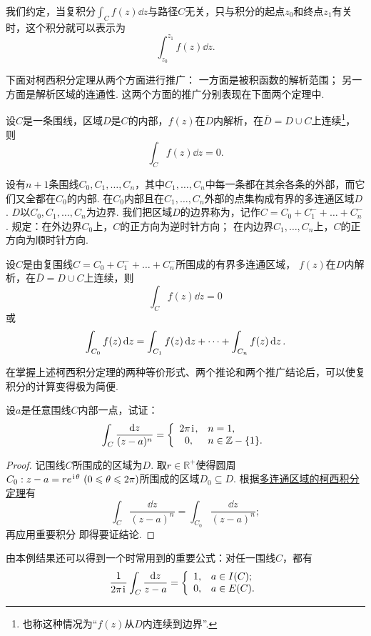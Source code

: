 我们约定，当复积分\(\int_C f(z) \dd{z}\)与路径\(C\)无关，只与积分的起点\(z_0\)和终点\(z_1\)有关时，这个积分就可以表示为\[
\int_{z_0}^{z_1} f(z) \dd{z}.
\]

下面对柯西积分定理从两个方面进行推广：
一方面是被积函数的解析范围；
另一方面是解析区域的连通性.
这两个方面的推广分别表现在下面两个定理中.
\begin{theorem}
设\(C\)是一条围线，区域\(D\)是\(C\)的内部，\(f(z)\)在\(D\)内解析，在\(\overline{D}=D \cup C\)上连续\footnote{%
也称这种情况为“\(f(z)\)从\(D\)内连续到边界”.%
}，则\[
\int_C f(z) \dd{z} = 0.
\]
\end{theorem}

\begin{definition}
设有\(n+1\)条围线\(C_0,C_1,\dots,C_n\)，其中\(C_1,\dots,C_n\)中每一条都在其余各条的外部，而它们又全都在\(C_0\)的内部.
在\(C_0\)内部且在\(C_1,\dots,C_n\)外部的点集构成有界的多连通区域\(D\).
\(D\)以\(C_0,C_1,\dots,C_n\)为边界.
我们把区域\(D\)的边界称为，记作\(C=C_0+C_1^-+\dots+C_n^-\).
规定：在外边界\(C_0\)上，\(C\)的正方向为逆时针方向；
在内边界\(C_1,\dots,C_n\)上，\(C\)的正方向为顺时针方向.
\end{definition}

\begin{theorem}[多连通区域的柯西积分定理]\label{theorem:解析函数的积分表示.多连通区域的柯西积分定理}
设\(C\)是由复围线\(C=C_0+C_1^-+\dots+C_n^-\)所围成的有界多连通区域，%
\(f(z)\)在\(D\)内解析，在\(\overline{D}=D \cup C\)上连续，则\[
\int_C f(z) \dd{z} = 0
\]或\begin{equation}
\def\Ic#1{\int_{C_{#1}} f(z) \dd{z}}
\Ic{0} = \Ic{1} + \dots + \Ic{n}.
\end{equation}
\end{theorem}

在掌握上述柯西积分定理的两种等价形式、两个推论和两个推广结论后，可以使复积分的计算变得极为简便.

\begin{example}
设\(a\)是任意围线\(C\)内部一点，试证：\[
\int_C \frac{\dd{z}}{(z-a)^n} = \left\{ \begin{array}{cl}
2\pi\kern1pt\mathrm{i}\kern1pt, & n=1, \\
0, & n\in\mathbb{Z}-\{1\}.
\end{array} \right.
\]
\begin{proof}
记围线\(C\)所围成的区域为\(D\).
取\(r\in\mathbb{R}^+\)使得圆周\(C_0: z - a = r e^{\kern1pt\mathrm{i}\kern1pt\theta}\ (0 \leqslant \theta \leqslant 2\pi)\)所围成的区域\(D_0 \subseteq D\).
根据\hyperref[theorem:解析函数的积分表示.多连通区域的柯西积分定理]{多连通区域的柯西积分定理}有\[
\int_C \frac{\dd{z}}{(z-a)^n} = \int_{C_0} \frac{\dd{z}}{(z-a)^n};
\]再应用重要积分  即得要证结论.
\end{proof}
\end{example}
由本例结果还可以得到一个时常用到的重要公式：对任一围线\(C\)，都有\begin{equation}\label{equation.解析函数的积分表示.重要积分2}
\frac{1}{2\pi\kern1pt\mathrm{i}\kern1pt} \int_C \frac{\dd{z}}{z-a}
= \left\{ \begin{array}{ll}
1, & a \in I(C); \\
0, & a \in E(C).
\end{array} \right.
\end{equation}

